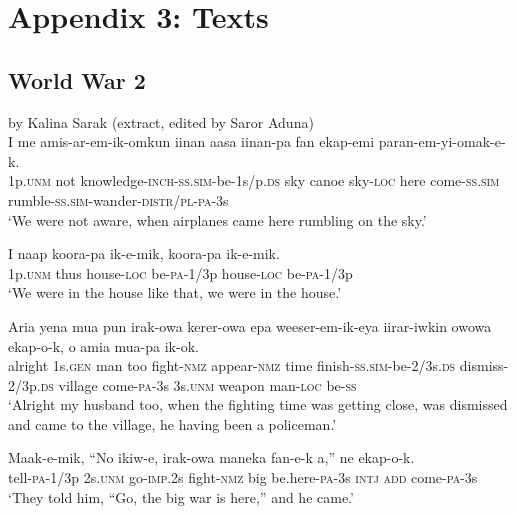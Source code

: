 
\chapter{Appendix 3: Texts}

\setcounter{equation}{0}
\section{World War 2}
  by Kalina Sarak  (extract, edited by Saror Aduna) \\
\ea\label{ex:a:x1}
\gll  I  me  amis-ar-em-ik-omkun  iinan  aasa  iinan-pa  fan  ekap-emi  paran-em-yi-omak-e-k. \\
1p.\textsc{unm}  not  knowledge-\textsc{inch}-\textsc{ss}.\textsc{sim}-be-1s/p.\textsc{ds}  sky  canoe sky-\textsc{loc}  here  come-\textsc{ss}.\textsc{sim}  rumble-\textsc{ss}.\textsc{sim}-wander-\textsc{distr}/\textsc{pl}-\textsc{pa}-3s \\
\glt ‘We were not aware, when airplanes came here rumbling on the sky.’
\z


\ea\label{ex:a:x2}
\gll  I  naap  koora-pa  ik-e-mik,  koora-pa  ik-e-mik. \\
1p.\textsc{unm}  thus  house-\textsc{loc}  be-\textsc{pa}-1/3p  house-\textsc{loc}  be-\textsc{pa}-1/3p \\
\glt ‘We were in the house like that, we were in the house.’
\z


\ea\label{ex:a:x3}
\gll  Aria  yena  mua  pun  irak-owa  kerer-owa  epa weeser-em-ik-eya  iirar-iwkin  owowa  ekap-o-k, o  amia  mua-pa  ik-ok. \\
alright  1s.\textsc{gen}  man  too  fight-\textsc{nmz}  appear-\textsc{nmz}  time finish-\textsc{ss}.\textsc{sim}-be-2/3s.\textsc{ds}  dismiss-2/3p.\textsc{ds}  village  come-\textsc{pa}-3s 3s.\textsc{unm}  weapon  man-\textsc{loc}  be-\textsc{ss} \\
\glt ‘Alright my husband too, when the fighting time was getting close, was dismissed and came to the village, he having been a policeman.’ \\
\z


\ea\label{ex:a:x4}
\gll  Maak-e-mik,  “No  ikiw-e,  irak-owa  maneka  fan-e-k a,”  ne  ekap-o-k. \\
tell-\textsc{pa}-1/3p  2s.\textsc{unm}  go-\textsc{imp}.2s  fight-\textsc{nmz}  big  be.here-\textsc{pa}-3s \textsc{intj}  \textsc{add}  come-\textsc{pa}-3s \\
\glt ‘They told him, “Go, the big war is here,” and he came.’ \\
\z


